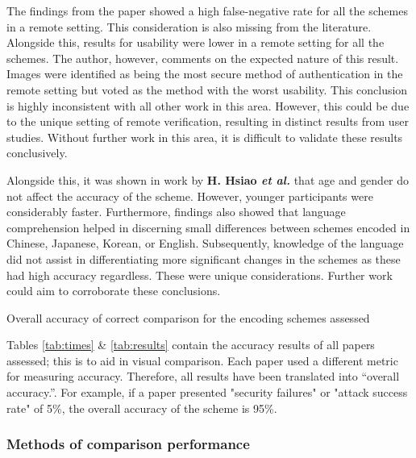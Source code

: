 The findings from the paper showed a high false-negative rate for all the schemes in a remote setting. This consideration is also missing from the literature. Alongside this, results for usability were lower in a remote setting for all the schemes. The author, however, comments on the expected nature of this result.\\
Images were identified as being the most secure method of authentication in the remote setting but voted as the method with the worst usability. This conclusion is highly inconsistent with all other work in this area. However, this could be due to the unique setting of remote verification, resulting in distinct results from user studies. Without further work in this area, it is difficult to validate these results conclusively.

Alongside this, it was shown in work by \textbf{H. Hsiao \textit{et al.}}\cite{hsiao2009study} that age and gender do not affect the accuracy of the scheme. However, younger participants were considerably faster. Furthermore, findings also showed that language comprehension helped in discerning small differences between schemes encoded in Chinese, Japanese, Korean, or English. Subsequently, knowledge of the language did not assist in differentiating more significant changes in the schemes as these had high accuracy regardless. These were unique considerations. Further work could aim to corroborate these conclusions.

\begin{table}[h!]
    \centering
    \resizebox{.8\textwidth}{!}{%

        \makebox[\textwidth][c]{
            
        }%
    }
    \caption{Overall accuracy of correct comparison for the encoding schemes assessed}
    \label{tab:results}
\end{table}

Tables \ref{tab:times} \& \ref{tab:results} contain the accuracy results of all papers assessed; this is to aid in visual comparison. Each paper used a different metric for measuring accuracy. Therefore, all results have been translated into ``overall accuracy.''. For example, if a paper presented "security failures" or "attack success rate" of 5\%, the overall accuracy of the scheme is 95\%.

\subsubsection*{Methods of comparison performance}

